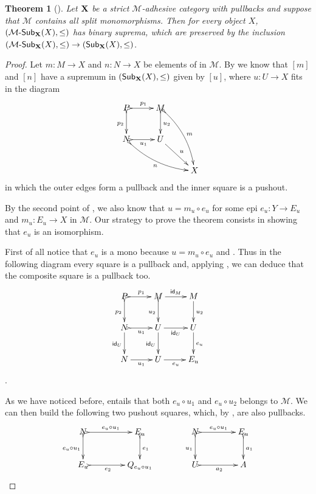 \documentclass[a4paper]{article}
\newcommand{\sub}[3]{{\mathcal{#1}}\textrm{-}\mathsf{Sub}_{\textbf {\textup{#2}}}(#3)}
\newcommand{\msub}[2]{\mathsf{Sub}_{\textbf {\textup{#1}}}(#2)}
\newcommand{\id}[1]{\mathsf{id}_{#1}}
\def\X{\textbf {\textup{X}}}
\newtheorem{theorem}{Theorem}[section]
\theoremstyle{definition}
\begin{document}
 \begin{theorem}[\cite{garner2012axioms,castelnovo2023thesis,johnstone2007quasitoposes}]\label{thm:un}Let $\X$ be a strict $\mathcal{M}$-adhesive category with pullbacks and suppose that $\mathcal{M}$ contains all split monomorphisms. Then for every object $X$, $(\sub{M}{X}{X}, \leq)$ has binary suprema, which are preserved by the inclusion $(\sub{M}{X}{X}, \leq)\to (\msub{X}{X}, \leq)$.
 \end{theorem}
\begin{proof}	Let $m\colon M\to X$  and $n\colon N\to X$ be elements of in $\mathcal{M}$. By  we know that $[m]$ and $[n]$  have a supremum in $(\msub{X}{X}, \leq)$ given by $[u]$, where $u\colon U\to X$ fits in the  diagram
	\[\xymatrix{P \ar@{>->}[r]^{p_1} \ar@{>->}[d]_{p_2} & M\ar@{>->}[d]^{u_2} \ar@{>->}@/^.3cm/[ddr]^{m} \\ N \ar@{>->}@/_.3cm/[drr]_{n}\ar@{>->}[r]_{u_1} & U \ar[dr]^{u} \\ && X}\]
	in which the outer edges form a pullback and the inner square is a pushout.  
	
	 By the second point of , we also know that $u=m_u\circ e_u$ for some epi $e_u\colon Y\to E_u$ and $m_u\colon E_u\to X$ in $\mathcal{M}$. Our strategy to prove the theorem consists in showing that $e_u$ is an isomorphism.
	 

	First of all notice that $e_u$ is a mono because $u=m_u\circ e_u$ and . Thus in the following diagram every square is a pullback and, applying , we can deduce that the composite square is a pullback too.
	\[\xymatrix{P \ar@{>->}[r]^{p_1} \ar@{>->}[d]_{p_2}& M \ar[r]^{\id{M}} \ar@{>->}[d]_{u_2} & M \ar[d]^{u_2} \\ N \ar@{>->}[r]_{u_1}  \ar[d]_{\id{U}}& U \ar[r]_{\id{U}} \ar[d]_{\id{U}} & U \ar[d]^{e_u} \\ N  \ar[r]_{u_1}& U \ar[r]_{e_u} & E_u}\].
	
	 As we have noticed before,  entails that both $e_u\circ u_1$ and $e_u\circ u_2$ belongs to $\mathcal{M}$. We can then build the following two pushout squares, which, by , are also pullbacks.
	\[\xymatrix@C=40pt{N \ar@{>->}[r]^-{e_u\circ u_1} \ar@{>->}[d]_{e_u\circ u_1} & E_u \ar@{>->}[d]^{e_1} & N \ar@{>->}[r]^-{e_u\circ u_1} \ar@{>->}[d]_{ u_1} & E_u \ar@{>->}[d]^{a_1} \\ E_u   \ar@{>->}[r]_-{e_2} & Q_{e_u\circ u_1} & U \ar@{>->}[r]_{a_2}& A}\]
	

\end{proof}
\end{document}
